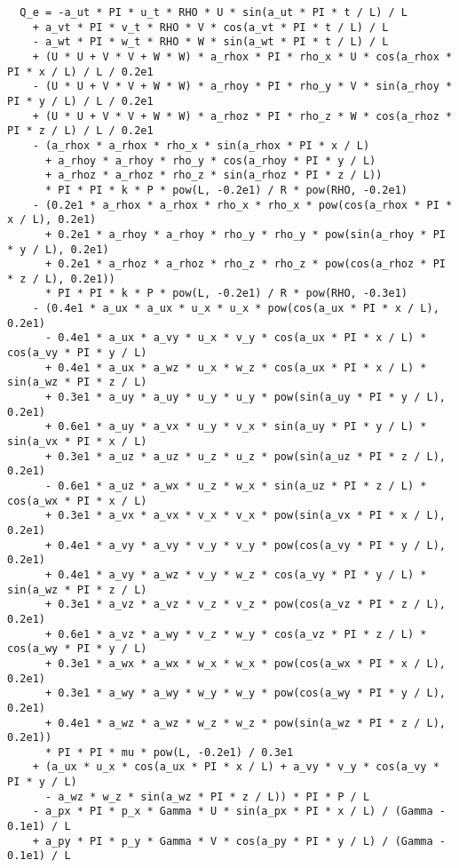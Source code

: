 \documentclass[10pt]{article}
\begin{document}
\begin{small}
\begin{verbatim}
  Q_e = -a_ut * PI * u_t * RHO * U * sin(a_ut * PI * t / L) / L
    + a_vt * PI * v_t * RHO * V * cos(a_vt * PI * t / L) / L
    - a_wt * PI * w_t * RHO * W * sin(a_wt * PI * t / L) / L
    + (U * U + V * V + W * W) * a_rhox * PI * rho_x * U * cos(a_rhox * PI * x / L) / L / 0.2e1
    - (U * U + V * V + W * W) * a_rhoy * PI * rho_y * V * sin(a_rhoy * PI * y / L) / L / 0.2e1
    + (U * U + V * V + W * W) * a_rhoz * PI * rho_z * W * cos(a_rhoz * PI * z / L) / L / 0.2e1
    - (a_rhox * a_rhox * rho_x * sin(a_rhox * PI * x / L)
      + a_rhoy * a_rhoy * rho_y * cos(a_rhoy * PI * y / L)
      + a_rhoz * a_rhoz * rho_z * sin(a_rhoz * PI * z / L))
      * PI * PI * k * P * pow(L, -0.2e1) / R * pow(RHO, -0.2e1)
    - (0.2e1 * a_rhox * a_rhox * rho_x * rho_x * pow(cos(a_rhox * PI * x / L), 0.2e1)
      + 0.2e1 * a_rhoy * a_rhoy * rho_y * rho_y * pow(sin(a_rhoy * PI * y / L), 0.2e1)
      + 0.2e1 * a_rhoz * a_rhoz * rho_z * rho_z * pow(cos(a_rhoz * PI * z / L), 0.2e1))
      * PI * PI * k * P * pow(L, -0.2e1) / R * pow(RHO, -0.3e1)
    - (0.4e1 * a_ux * a_ux * u_x * u_x * pow(cos(a_ux * PI * x / L), 0.2e1)
      - 0.4e1 * a_ux * a_vy * u_x * v_y * cos(a_ux * PI * x / L) * cos(a_vy * PI * y / L)
      + 0.4e1 * a_ux * a_wz * u_x * w_z * cos(a_ux * PI * x / L) * sin(a_wz * PI * z / L)
      + 0.3e1 * a_uy * a_uy * u_y * u_y * pow(sin(a_uy * PI * y / L), 0.2e1)
      + 0.6e1 * a_uy * a_vx * u_y * v_x * sin(a_uy * PI * y / L) * sin(a_vx * PI * x / L)
      + 0.3e1 * a_uz * a_uz * u_z * u_z * pow(sin(a_uz * PI * z / L), 0.2e1)
      - 0.6e1 * a_uz * a_wx * u_z * w_x * sin(a_uz * PI * z / L) * cos(a_wx * PI * x / L)
      + 0.3e1 * a_vx * a_vx * v_x * v_x * pow(sin(a_vx * PI * x / L), 0.2e1)
      + 0.4e1 * a_vy * a_vy * v_y * v_y * pow(cos(a_vy * PI * y / L), 0.2e1)
      + 0.4e1 * a_vy * a_wz * v_y * w_z * cos(a_vy * PI * y / L) * sin(a_wz * PI * z / L)
      + 0.3e1 * a_vz * a_vz * v_z * v_z * pow(cos(a_vz * PI * z / L), 0.2e1)
      + 0.6e1 * a_vz * a_wy * v_z * w_y * cos(a_vz * PI * z / L) * cos(a_wy * PI * y / L)
      + 0.3e1 * a_wx * a_wx * w_x * w_x * pow(cos(a_wx * PI * x / L), 0.2e1)
      + 0.3e1 * a_wy * a_wy * w_y * w_y * pow(cos(a_wy * PI * y / L), 0.2e1)
      + 0.4e1 * a_wz * a_wz * w_z * w_z * pow(sin(a_wz * PI * z / L), 0.2e1))
      * PI * PI * mu * pow(L, -0.2e1) / 0.3e1
    + (a_ux * u_x * cos(a_ux * PI * x / L) + a_vy * v_y * cos(a_vy * PI * y / L)
      - a_wz * w_z * sin(a_wz * PI * z / L)) * PI * P / L
    - a_px * PI * p_x * Gamma * U * sin(a_px * PI * x / L) / (Gamma - 0.1e1) / L
    + a_py * PI * p_y * Gamma * V * cos(a_py * PI * y / L) / (Gamma - 0.1e1) / L

\end{verbatim}
\end{small}
\end{document}
